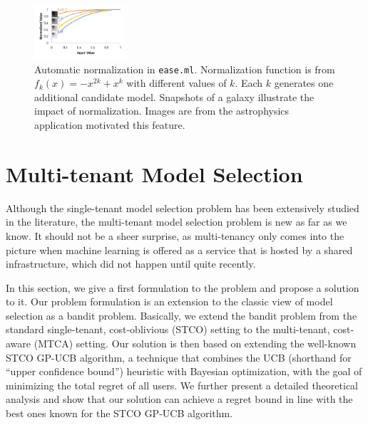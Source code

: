 \documentclass[letterpaper]{vldb}
\newcommand{\eml}{\texttt{ease.ml}\xspace}
\begin{document}
\begin{figure}[t]
\centering
\includegraphics[width=0.3\textwidth]{figures/normalize}
\vspace{-2em}
\caption{Automatic normalization in \eml. Normalization function
is from $f_k(x) = -x^{2k} + x^{k}$ with different 
values of $k$. Each $k$ generates one additional candidate
model. Snapshots of a galaxy illustrate the impact of
normalization. Images are from the astrophysics 
application motivated this feature.}
 \label{fig:normalization}
\end{figure}






\section{Multi-tenant Model Selection}\label{sec:multitenant}

Although the single-tenant model selection problem has been extensively studied in the literature, the multi-tenant model selection problem is new as far as we know.
It should not be a sheer surprise, as multi-tenancy only comes into the picture when machine learning is offered as a service that is hosted by a shared infrastructure, which did not happen until quite recently.

In this section, we give a first formulation to the problem and propose a solution to it.
Our problem formulation is an extension to the classic view of model selection as a bandit problem.
Basically, we extend the bandit problem from the standard single-tenant, cost-oblivious (STCO) setting to the multi-tenant, cost-aware (MTCA) setting.
Our solution is then based on extending the well-known STCO GP-UCB algorithm, a technique that combines the UCB (shorthand for ``upper confidence bound'') heuristic with Bayesian optimization, with the goal of minimizing the total regret of all users.
We further present a detailed theoretical analysis and show that our solution can achieve a regret bound in line with the best ones known for the STCO GP-UCB algorithm.
\end{document}
